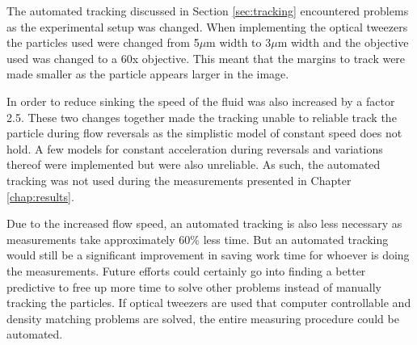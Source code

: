 The automated tracking discussed in Section \ref{sec:tracking} encountered problems as the experimental setup was changed. When implementing the optical tweezers the particles used were changed from 5$\mu$m width to 3$\mu$m width and the objective used was changed to a 60x objective. This meant that the margins to track were made smaller as the particle appears larger in the image. 

In order to reduce sinking the speed of the fluid was also increased by a factor 2.5. These two changes together made the tracking unable to reliable track the particle during flow reversals as the simplistic model of constant speed does not hold. A few models for constant acceleration during reversals and variations thereof were implemented but were also unreliable. As such, the automated tracking was not used during the measurements presented in Chapter \ref{chap:results}. 

Due to the increased flow speed, an automated tracking is also less necessary as measurements take approximately 60\% less time. But an automated tracking would still be a significant improvement in saving work time for whoever is doing the measurements. Future efforts could certainly go into finding a better predictive to free up more time to solve other problems instead of manually tracking the particles. If optical tweezers are used that computer controllable and density matching problems are solved, the entire measuring procedure could be automated.

